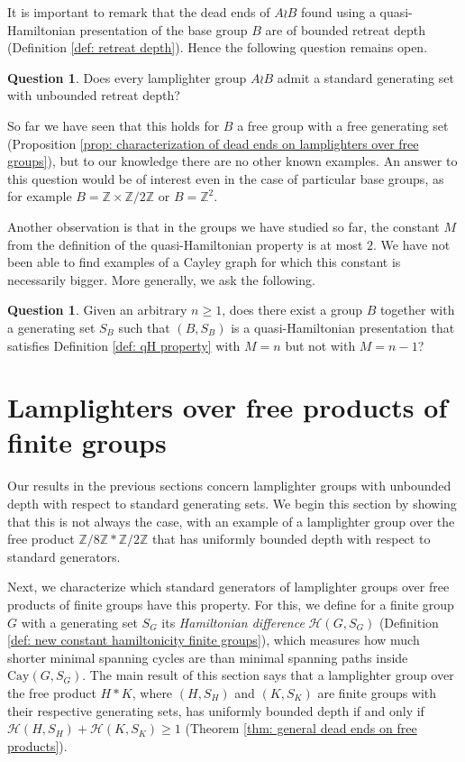 \documentclass[reqno,oneside]{amsart}
\newcommand{\cay}[2]{\mathrm{Cay}(#1,#2)}
\newcommand{\Z}{\mathbb{Z}}
\theoremstyle{plain}
\theoremstyle{definition}
\newtheorem{question}[thm]{Question}
\begin{document}
It is important to remark that the dead ends of $A\wr B$ found using a quasi-Hamiltonian presentation of the base group $B$ are of bounded retreat depth (Definition \ref{def: retreat depth}). Hence the following question remains open.
\begin{question}
	Does every lamplighter group $A\wr B$ admit a standard generating set with unbounded retreat depth?
\end{question}

So far we have seen that this holds for $B$ a free group with a free generating set (Proposition \ref{prop: characterization of dead ends on lamplighters over free groups}), but to our knowledge there are no other known examples. An answer to this question would be of interest even in the case of particular base groups, as for example $B=\Z\times \Z/2\Z$ or $B=\Z^2$.


Another observation is that in the groups we have studied so far, the constant $M$ from the definition of the quasi-Hamiltonian property is at most $2$. We have not been able to find examples of a Cayley graph for which this constant is necessarily bigger. More generally, we ask the following.
\begin{question}
	Given an arbitrary $n\ge 1$, does there exist a group $B$ together with a generating set $S_B$ such that $(B,S_B)$ is a quasi-Hamiltonian presentation that satisfies Definition \ref{def: qH property} with $M=n$ but not with $M=n-1$?
\end{question}




\section{Lamplighters over free products of finite groups}\label{section: lamplighters over free products}
Our results in the previous sections concern lamplighter groups with unbounded depth with respect to standard generating sets. We begin this section by showing that this is not always the case, with an example of a lamplighter group over the free product $\Z/8\Z*\Z/2\Z$ that has uniformly bounded depth with respect to standard generators. 

Next, we characterize which standard generators of lamplighter groups over free products of finite groups have this property. For this, we define for a finite group $G$ with a generating set $S_G$ its \textit{Hamiltonian difference} $\mathscr{H}(G,S_G)$ (Definition \ref{def: new constant hamiltonicity finite groups}), which measures how much shorter minimal spanning cycles are than minimal spanning paths inside $\cay{G}{S_G}$. The main result of this section says that a lamplighter group over the free product $H*K$, where $(H,S_H)$ and $(K,S_K)$ are finite groups with their respective generating sets, has uniformly bounded depth if and only if $\mathscr{H}(H,S_H)+\mathscr{H}(K,S_K)\ge 1$ (Theorem \ref{thm: general dead ends on free products}).
\end{document}
